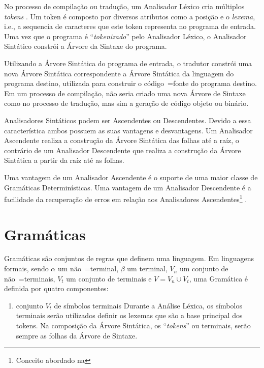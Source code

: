 {    No processo de compilação ou
    tradução,
    um Analisador Léxico cria múltiplos \textit{tokens} \cite{ahoCompilerDragonBook}.
    Um token é composto por diversos atributos como a posição e
    o \textit{lexema}, i.e.,
    a sequencia de caracteres que este token representa no programa de entrada.
    Uma vez que o programa é ``\textit{tokenizado}'' pelo Analisador Léxico,
    o Analisador Sintático constrói a Árvore da Sintaxe do programa.

    Utilizando a Árvore Sintática do programa de entrada,
    o tradutor constrói uma nova Árvore Sintática correspondente a Árvore Sintática da linguagem do programa destino,
    utilizada para construir o código~=fonte do programa destino.
    Em um processo de compilação,
    não seria criado uma nova Árvore de Sintaxe como no processo de tradução,
    mas sim a geração de código objeto ou
    binário.

    Analisadores Sintáticos podem ser Ascendentes ou
    Descendentes.
    Devido a essa característica ambos possuem as suas vantagens e
    desvantagens.
    Um Analisador Ascendente realiza a construção da Árvore Sintática das folhas até a raíz,
    o contrário de um Analisador Descendente que realiza a construção da Árvore Sintática a partir da raíz até as folhas.

    Uma vantagem de um Analisador Ascendente é o suporte de uma maior classe de Gramáticas Determinísticas.
    Uma vantagem de um Analisador Descendente é a facilidade da recuperação de erros em relação aos Analisadores Ascendentes\footnote{Conceito abordado na
    } \cite{sippu1982,lr1ErrorRecovery,larkJosefGrosch}.


\section{Gramáticas}

    Gramáticas são conjuntos de regras que definem uma linguagem.
    Em linguagens formais,
    sendo $\alpha$ um não~=terminal,
    $\beta$ um terminal,
    $V_n$ um conjunto de não~=terminais,
    $V_t$ um conjunto de terminais e
    $V = V_n \cup V_t$,
    uma Gramática é definida por quatro componentes:
    \begin{enumerate}%
        \item {} conjunto $V_t$ de símbolos terminais
        Durante a Análise Léxica,
        os símbolos terminais serão utilizados definir os lexemas que são a base principal dos tokens.
        Na composição da Árvore Sintática,
        os ``\textit{tokens}'' ou terminais,
        serão sempre as folhas da Árvore de Sintaxe.


\end{enumerate}}
